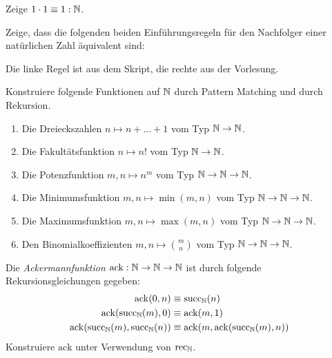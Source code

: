 \documentclass{uebung}
\begin{document}

\begin{exercise}
  Zeige $1\cdot 1\equiv 1:\mathbb{N}$.
\end{exercise}


\begin{exercise}
  Zeige, dass die folgenden beiden Einführungsregeln für den Nachfolger einer natürlichen Zahl äquivalent sind:
  {\tiny Die linke Regel ist aus dem Skript, die rechte aus der Vorlesung.}
\end{exercise}

\begin{exercise}
  Konstruiere folgende Funktionen auf $\mathbb{N}$ durch Pattern Matching und durch Rekursion.
  \begin{enumerate}
    \item Die Dreieckszahlen $n\mapsto n+\dots+1$ vom Typ $\mathbb{N}\to\mathbb{N}$.
    \item Die Fakultätsfunktion $n\mapsto n!$ vom Typ $\mathbb{N}\to\mathbb{N}$.
    \item Die Potenzfunktion $m,n\mapsto n^m$ vom Typ $\mathbb{N}\to\mathbb{N}\to\mathbb{N}$.
    \item Die Minimumsfunktion $m,n\mapsto\min(m,n)$ vom Typ $\mathbb{N}\to\mathbb{N}\to\mathbb{N}$.
    \item Die Maximumsfunktion $m,n\mapsto\max(m,n)$ vom Typ $\mathbb{N}\to\mathbb{N}\to\mathbb{N}$.
    \item Den Binomialkoeffizienten $m,n\mapsto\binom{m}{n}$ vom Typ $\mathbb{N}\to\mathbb{N}\to\mathbb{N}$.
  \end{enumerate}
\end{exercise}

\begin{exercise}
  Die \emph{Ackermannfunktion} $\mathrm{ack}:\mathbb{N}\to\mathbb{N}\to\mathbb{N}$ ist durch folgende Rekursionsgleichungen gegeben:
  \begin{align*}
    \mathrm{ack}(0,n)&\equiv\mathrm{succ}_{\mathbb{N}}(n)\\
    \mathrm{ack}(\mathrm{succ}_{\mathbb{N}}(m),0)&\equiv\mathrm{ack}(m,1)\\
    \mathrm{ack}(\mathrm{succ}_{\mathbb{N}}(m),\mathrm{succ}_{\mathbb{N}}(n))&\equiv\mathrm{ack}(m,\mathrm{ack}(\mathrm{succ}_{\mathbb{N}}(m),n))
  \end{align*}
  Konstruiere $\mathrm{ack}$ unter Verwendung von $\mathrm{rec}_{\mathbb{N}}$.
\end{exercise}
\end{document}
